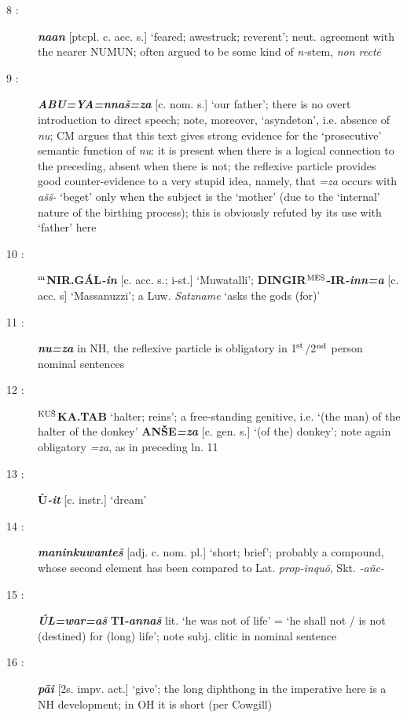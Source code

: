 \documentclass[10pt]{article}
\newcommand{\supersc}[1]{$^{\textrm{\scriptsize{#1}}}$}  	%
\newcommand{\bit}[1]{\textbf{\textit{#1}}}				%
\newcommand{\p}[1]{{\tiny[{#1}]}}					%
\newcommand{\hith}{\textsubwedge{h}}
\newcommand{\mpl}{\supersc{ME\v{S}}}
\renewcommand{\.}[1]{\textsubdot{#1}}
\begin{document}
\begin{description}
\item[8 :] \bit{na{\hith\hith}an} \p{ptcpl. c. acc. s.} `feared; awestruck; reverent'; neut. agreement with the nearer NUMUN; often argued to be some kind of \textit{n-}stem, \textit{non rect\=e}

\item[9 :] \bit{ABU=YA=nna\v{s}=za} \p{c. nom. s.} `our father'; there is no overt introduction to direct speech; note, moreover, `asyndeton', i.e. absence of \textit{nu}; CM argues that this text gives strong evidence for the `prosecutive' semantic function of \textit{nu}: it is present when there is a logical connection to the preceding, absent when there is not; the reflexive particle provides good counter-evidence to a very stupid idea, namely, that \textit{=za} occurs with \textit{{\hith}a\v{s}\v{s}-} `beget' only when the subject is the `mother' (due to the `internal' nature of the birthing process); this is obviously refuted by its use with `father' here

\item[10 :] \textbf{\supersc{m}NIR.G\'AL}\bit{-in} \p{c. acc. s.; i-st.} `Muwatalli'; \textbf{DINGIR{\mpl}-IR}\bit{-inn=a} \p{c. acc. s} `Massanuzzi'; a Luw. \textit{Satzname} `asks the gods (for)'

\item[11 :] \bit{nu=za} in NH, the reflexive particle is obligatory in 1\supersc{st}/2\supersc{nd} person nominal sentences

\item[12 :] \textbf{\supersc{KU\v{S}}KA.TAB} `halter; reins'; a free-standing genitive, i.e. `(the man) of the halter of the donkey' \textbf{AN\v{S}E}\bit{=za} \p{c. gen. s.} `(of the) donkey'; note again obligatory \textit{=za}, as in preceding ln. 11

\item[13 :] \textbf{\`U}\bit{-it} \p{c. instr.} `dream'

\item[14 :] \bit{maninkuwante\v{s}} \p{adj. c. nom. pl.} `short; brief'; probably a compound,  whose second element has been compared to Lat. \textit{prop-inqu\=o}, Skt. \textit{-a\~nc-}

\item[15 :] \bit{\'UL=war=a\v{s}} \textbf{TI}\bit{-anna\v{s}} lit. `he was not of life' = `he shall not / is not (destined) for (long) life'; note subj. clitic in nominal sentence

\item[16 :] \bit{p\=ai} \p{2s. impv. act.} `give'; the long diphthong in the imperative here is a NH development; in OH it is short (per Cowgill)


\end{description}
\end{document}
